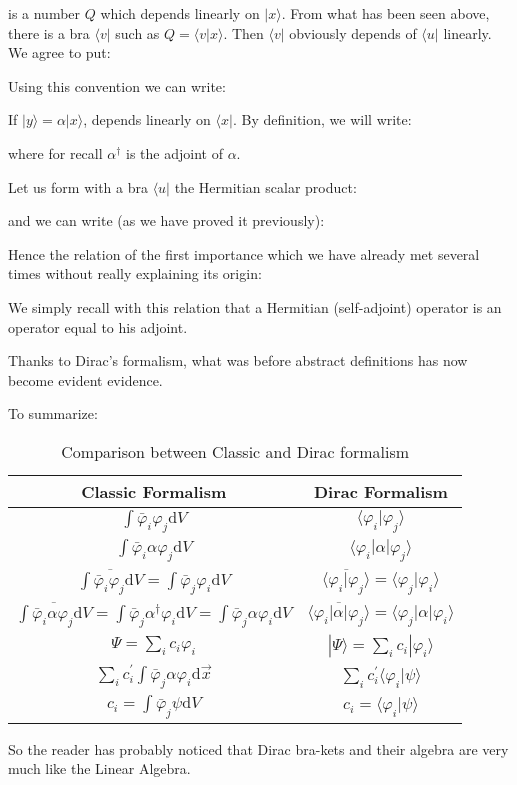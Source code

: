 	is a number $Q$ which depends linearly on $|x\rangle$. From what has been seen above, there is a bra $\langle v|$ such as $Q=\langle v|x\rangle$. Then $\langle v|$ obviously depends of $\langle u|$ linearly. We agree to put:
	
	Using this convention we can write:
	
	If $|y\rangle=\alpha|x\rangle$, depends linearly on $\langle x|$. By definition, we will write:
	
	where for recall $\alpha^\dagger$ is the adjoint of $\alpha$.
	
	Let us form with a bra $\langle u|$ the Hermitian scalar product:
	
	and we can write (as we have proved it previously):
	
	Hence the relation of the first importance which we have already met several times without really explaining its origin:
	
	We simply recall with this relation that a Hermitian (self-adjoint) operator is an operator equal to his adjoint.

	Thanks to Dirac's formalism, what was before abstract definitions has now become evident evidence.

	To summarize:
	\setlength\extrarowheight{10pt}
	\begin{table}[H]
		\centering
		\begin{tabular}{|c|c|}
		\hline
		\rowcolor[HTML]{9B9B9B} 
		\textbf{Classic Formalism} & \textbf{Dirac Formalism} \\ \hline
		$\displaystyle\int \bar{\varphi}_i\varphi_j\mathrm{d}V$ &  $\langle \varphi_i | \varphi_j\rangle$\\ \hline
		$\displaystyle\int \bar{\varphi}_i\alpha\varphi_j\mathrm{d}V$ & $\langle \varphi_i | \alpha | \varphi_j\rangle$ \\ \hline
		$\overline{\displaystyle\int \bar{\varphi}_i\varphi_j\mathrm{d}V}=\displaystyle\int \bar{\varphi}_j\varphi_i\mathrm{d}V$ &  $\overline{\langle \varphi_i|\varphi_j\rangle}=\langle \varphi_j|\varphi_i\rangle$\\ \hline
		$\overline{\displaystyle\int \bar{\varphi}_i\alpha\varphi_j\mathrm{d}V}=\displaystyle\int \bar{\varphi}_j\alpha^\dagger\varphi_i\mathrm{d}V=\displaystyle\int\bar{\varphi}_j\alpha\varphi_i\mathrm{d}V$ &  $\overline{\langle \varphi_i|\alpha|\varphi_j\rangle}=\langle \varphi_j|\alpha|\varphi_i\rangle$\\ \hline
		$\Psi=\displaystyle\sum_i c_i\varphi_i$ & $|\Psi\rangle=\sum_i c_i|\varphi_i\rangle$\\ \hline
		$\displaystyle\sum_i c_i^{\prime}\displaystyle\int\bar{\varphi}_j\alpha\varphi_i\mathrm{d}\vec{x}$ & $\displaystyle\sum_i c_i^{\prime}\langle \varphi_i|\psi\rangle$ \\ \hline
		$c_i=\displaystyle\int\bar{\varphi}_j\psi\mathrm{d}V$ & $c_i=\langle \varphi_i |\psi\rangle$ \\ \hline
		\end{tabular}
		\caption{Comparison between Classic and Dirac formalism}
	\end{table}
	\setlength\extrarowheight{0pt}
	So the reader has probably noticed that Dirac bra-kets and their algebra are very much like the Linear Algebra.

